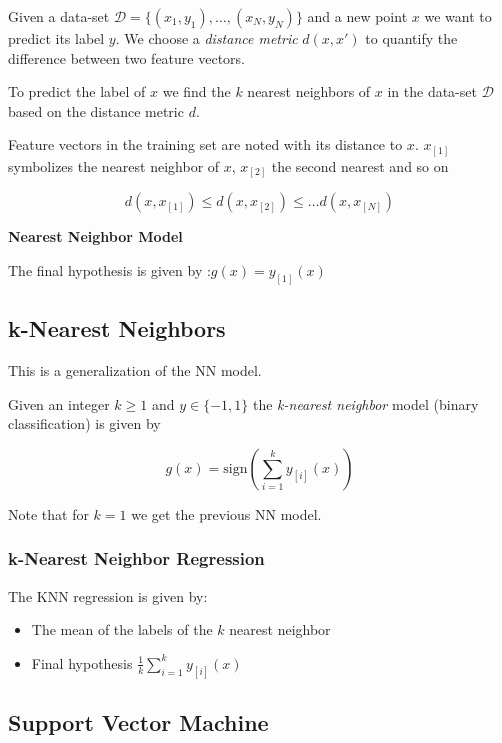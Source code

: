 Given a data-set \(\mathcal{D} = \{(x_1, y_1), \dots, (x_N, y_N)\}\) and a new point \(x\) we want to predict its label \(y\).
We choose a \emph{distance metric} \(d(x, x')\) to quantify the difference between two feature vectors. 

To predict the label of \(x\) we find the \(k\) nearest neighbors of \(x\) in the data-set \(\mathcal{D}\) based on the distance metric \(d\).

Feature vectors in the training set are noted with its distance to \(x\). \(x_{[1]}\) symbolizes the nearest neighbor of 
\(x\), \(x_{[2]}\) the second nearest and so on 

\[
    d(x, x_{[1]}) \le d(x, x_{[2]}) \le \dots d(x, x_{[N]})
\]

\textbf{Nearest Neighbor Model}

The final hypothesis is given by :\(g(x) = y_{[1]}(x)\)

\subsection{k-Nearest Neighbors}

This is a generalization of the NN model. 

Given an integer \(k \ge 1\) and \(y \in \{-1, 1\}\) the \emph{k-nearest neighbor} model (binary classification) is given by 

\[
    g(x) = \text{sign} \left(\sum_{i = 1}^{k} y_{[i]}(x)\right) 
\]

Note that for \(k = 1\) we get the previous NN model.

\subsubsection{k-Nearest Neighbor Regression}

The KNN regression is given by:

\begin{itemize}

    \item The mean of the labels of the \(k\) nearest neighbor 

    \item Final hypothesis \(\frac{1}{k} \sum_{i = 1}^{k} y_{[i]}(x)\)

\end{itemize}

\subsection{Support Vector Machine}

